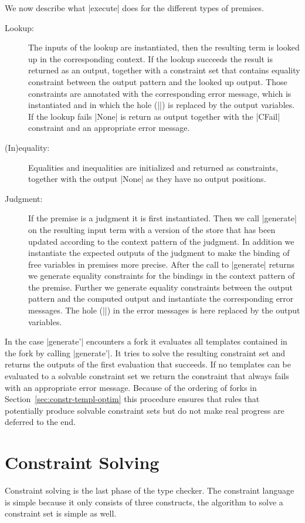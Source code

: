 We now describe what \code|execute| does for the different types of
premises.

\begin{description}
\item[Lookup:] The inputs of the lookup are instantiated, then the
  resulting term is looked up in the corresponding context. If the
  lookup succeeds the result is returned as an output, together with a
  constraint set that contains equality constraint between the output
  pattern and the looked up output. Those constraints are annotated
  with the corresponding error message, which is instantiated and in
  which the hole (\code|{}|) is replaced by the output variables. If
  the lookup fails \code|None| is return as output together with the
  \code|CFail| constraint and an appropriate error message.
\item[(In)equality:] Equalities and inequalities are initialized and
  returned as constraints, together with the output \code|None| as
  they have no output positions.
\item[Judgment:] If the premise is a judgment it is first
  instantiated. Then we call \code|generate| on the resulting input
  term with a version of the store that has been updated according to
  the context pattern of the judgment. In addition we instantiate the
  expected outputs of the judgment to make the binding of free
  variables in premises more precise. After the call to
  \code|generate| returns we generate equality constraints for the
  bindings in the context pattern of the premise. Further we generate
  equality constraints between the output pattern and the computed
  output and instantiate the corresponding error messages. The hole
  (\code|{}|) in the error messages is here replaced by the output
  variables.
\end{description}

In the case \code|generate'| encounters a fork it evaluates all
templates contained in the fork by calling \code|generate'|. It tries
to solve the resulting constraint set and returns the outputs of the
first evaluation that succeeds. If no templates can be evaluated to a
solvable constraint set we return the constraint that always fails
with an appropriate error message. Because of the ordering of forks in
Section~\ref{sec:constr-templ-optim} this procedure ensures that rules
that potentially produce solvable constraint sets but do not make real
progress are deferred to the end.

\section{Constraint Solving}
\label{sec:constraint-solving}
Constraint solving is the last phase of the type checker. The
constraint language is simple because it only consists of three
constructs, the algorithm to solve a constraint set is simple as well.

